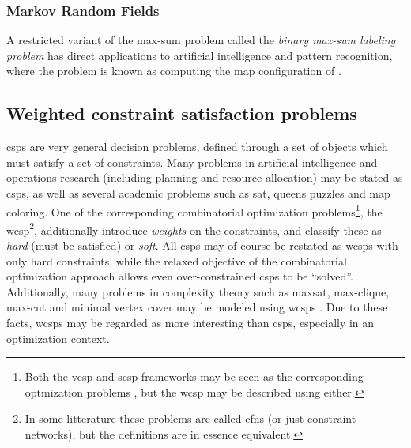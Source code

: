 
\subsubsection{Markov Random Fields}
A restricted variant of the max-sum problem called the \emph{binary max-sum labeling problem} has direct applications to artificial intelligence and pattern recognition, where the problem is known as computing the \gls{map} configuration of  \parencite[\pno~1165]{Werner07}.


\subsection{Weighted constraint satisfaction problems}
\Glspl{csp} are very general decision problems, defined through a set of objects which must satisfy a set of constraints.
Many problems in artificial intelligence and operations research (including planning and resource allocation) may be stated as \glspl{csp}, as well as several academic problems such as \gls{sat}, queens puzzles and map coloring.
One of the corresponding combinatorial optimization problems\footnote{Both the \gls{vcsp} and \gls{scsp} frameworks may be seen as the corresponding optmization problems \parencites{Meseguer06}{Bistarelli99}, but the \gls{wcsp} may be described using either.}, the \gls{wcsp}\footnote{In some litterature these problems are called \glspl{cfn} (or just constraint networks), but the definitions are in essence equivalent.}, additionally introduce \emph{weights} on the constraints, and classify these as \emph{hard} (must be satisfied) or \emph{soft}.
All \glspl{csp} may of course be restated as \glspl{wcsp} with only hard constraints, while the relaxed objective of the combinatorial optimization approach allows even over-constrained \glspl{csp} to be \enquote{solved}.
Additionally, many problems in complexity theory such as \gls{maxsat}, max-clique, max-cut and minimal vertex cover may be modeled using \glspl{wcsp} \parencite[\pno~315]{Meseguer06}.
Due to these facts, \glspl{wcsp} may be regarded as more interesting than \glspl{csp}, especially in an optimization context.

